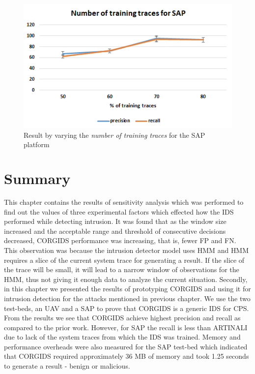 \begin{itemize}
\begin{figure}[ht]
    \centering
    \includegraphics[scale=0.75,keepaspectratio = true]{Graphics/SAP_traces.png}
    \caption{Result by varying the \textit{number of training traces} for the SAP platform}
    \label{fig:SAP_traces}
\end{figure}

\end{itemize}

\section{Summary}

This chapter contains the results of sensitivity analysis which was performed to find out the values of three experimental factors which effected how the \ac{IDS} performed while detecting intrusion. It was found that as the window size increased and the acceptable range and threshold of consecutive decisions decreased, \ac{CORGIDS} performance was increasing, that is, fewer \ac{FP} and \ac{FN}. This observation was because the intrusion detector model uses \ac{HMM} and \ac{HMM} requires a slice of the current system trace for generating a result. If the slice of the trace will be small, it will lead to a narrow window of observations for the \ac{HMM}, thus not giving it enough data to analyze the current situation. Secondly, in this chapter we presented the results of prototyping \ac{CORGIDS} and using it for intrusion detection for the attacks mentioned in previous chapter. We use the two test-beds, an \ac{UAV} and a \ac{SAP} to prove that \ac{CORGIDS} is a generic IDS for \ac{CPS}. From the results we see that \ac{CORGIDS} achieve highest precision and recall as compared to the prior work. However, for \ac{SAP} the recall is less than ARTINALI due to lack of the system traces from which the \ac{IDS} was trained. Memory and performance overheads were also measured for the \ac{SAP} test-bed which indicated that \ac{CORGIDS} required approximately 36 MB of memory and took 1.25 seconds to generate a result - benign or malicious.

\endinput
=====================================================================
